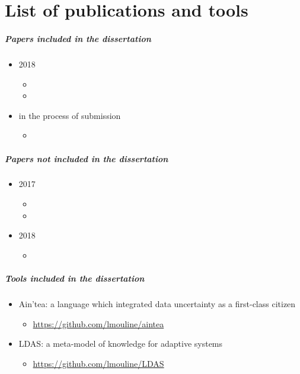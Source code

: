 \chapter*{List of publications and tools}

\paragraph{Papers included in the dissertation}

\begin{itemize}
	\item 2018
	\begin{itemize}
		\item {}
		\item {}
	\end{itemize}
	\item in the process of submission
	\begin{itemize}
		\item {}
	\end{itemize}
\end{itemize}

\paragraph{Papers not included in the dissertation}

\begin{itemize}
	\item 2017
	\begin{itemize}
		\item {}
		\item {}
	\end{itemize}
	\item 2018
	\begin{itemize}
		\item {}
	\end{itemize}
\end{itemize}

\paragraph{Tools included in the dissertation}

\begin{itemize}
	\item Ain'tea: a language which integrated data uncertainty as a first-class citizen
	\begin{itemize}
		\item \url{https://github.com/lmouline/aintea}
	\end{itemize}
	\item LDAS: a meta-model of knowledge for adaptive systems
	\begin{itemize}
		\item \url{https://github.com/lmouline/LDAS}
	\end{itemize}
\end{itemize}
